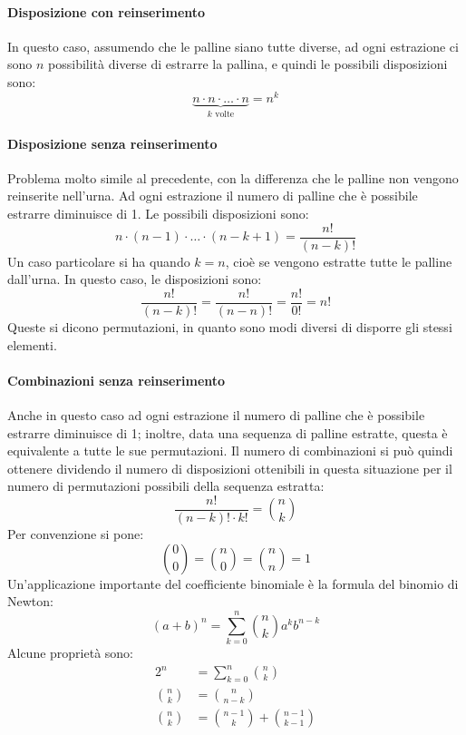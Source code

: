 \documentclass{article}
\theoremstyle{plain}
\theoremstyle{definition}
\theoremstyle{remark}
\begin{document}
\paragraph{Disposizione con reinserimento} %
\label{par:disposizione_con_reinserimento}
In questo caso, assumendo che le palline siano tutte diverse, ad ogni estrazione ci sono $n$ possibilità diverse di estrarre la pallina, e quindi le possibili disposizioni sono:
\begin{equation*}
	\underbrace{n\cdot n\cdot \ldots \cdot n}_{k \text{ volte}} = n^k
\end{equation*}
\paragraph{Disposizione senza reinserimento} %
\label{par:disposizione_senza_reinserimento}
Problema molto simile al precedente, con la differenza che le palline non vengono reinserite nell'urna. Ad ogni estrazione il numero di palline che è possibile estrarre diminuisce di 1. Le possibili disposizioni sono:
\begin{equation*}
	n\cdot (n-1) \cdot \ldots\cdot(n-k+1) = \frac{n!}{(n-k)!}
\end{equation*}
Un caso particolare si ha quando $k=n$, cioè se vengono estratte tutte le palline dall'urna. In questo caso, le disposizioni sono:
\begin{equation*}
	\frac{n!}{(n-k)!}=\frac{n!}{(n-n)!}=\frac{n!}{0!}=n!
\end{equation*}
Queste si dicono permutazioni, in quanto sono modi diversi di disporre gli stessi elementi.
\paragraph{Combinazioni senza reinserimento} %
\label{par:combinazioni_senza_reinserimento}
Anche in questo caso ad ogni estrazione il numero di palline che è possibile estrarre diminuisce di 1; inoltre, data una sequenza di palline estratte, questa è equivalente a tutte le sue permutazioni. Il numero di combinazioni si può quindi ottenere dividendo il numero di disposizioni ottenibili in questa situazione per il numero di permutazioni possibili della sequenza estratta:
\begin{equation*}
	\frac{n!}{(n-k)!\cdot k!}=\binom{n}{k}
\end{equation*}
Per convenzione si pone:
\begin{equation*}
	\binom{0}{0}=\binom{n}{0}=\binom{n}{n}=1
\end{equation*}
Un'applicazione importante del coefficiente binomiale è la formula del binomio di Newton:
\begin{equation*}
	(a+b)^n=\sum_{k=0}^n \binom{n}{k} a^k b^{n-k}
\end{equation*}
Alcune proprietà sono:
\begin{align*}
	2^n&=\sum_{k=0}^n \binom{n}{k}\\
	\binom{n}{k}&=\binom{n}{n-k}\\
	\binom{n}{k}&=\binom{n-1}{k}+\binom{n-1}{k-1}\\
\end{align*}
\end{document}
